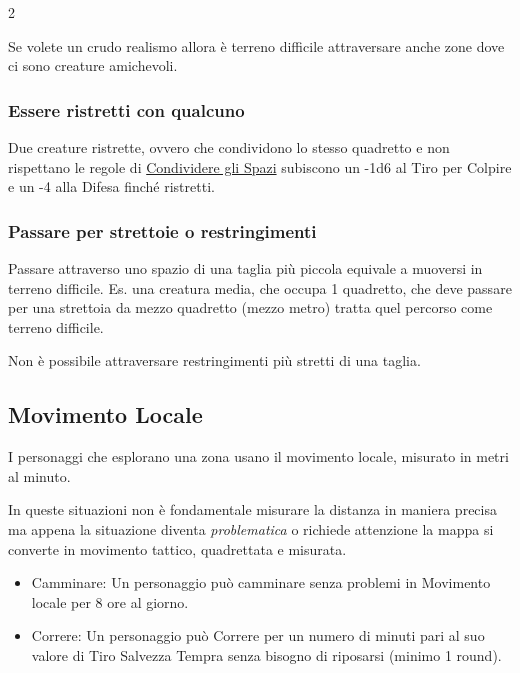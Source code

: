\begin{multicols}{2}
\begin{narratore}
Se volete un crudo realismo allora è terreno difficile attraversare anche zone dove ci sono creature amichevoli. \end{narratore}

\subsubsection{Essere ristretti con qualcuno}
Due creature ristrette, ovvero che condividono lo stesso quadretto e non rispettano le regole di \hyperlink{condividereglispazi}{Condividere gli Spazi} subiscono un -1d6 al Tiro per Colpire e un -4 alla Difesa finché ristretti.\hypertarget{ristretti}{}\label{ristretti}

\subsubsection{Passare per strettoie o restringimenti}

Passare attraverso uno spazio di una taglia più piccola equivale a muoversi in terreno difficile. Es. una creatura media, che occupa 1 quadretto, che deve passare per una strettoia da mezzo quadretto (mezzo metro) tratta quel percorso come terreno difficile.

Non è possibile attraversare restringimenti più stretti di una taglia.

\subsection{Movimento Locale}\label{movimentolocale}

I personaggi che esplorano una zona usano il movimento locale, misurato in metri al minuto.

In queste situazioni non è fondamentale misurare la distanza in maniera precisa ma appena la situazione diventa \emph{problematica} o richiede attenzione la mappa si converte in movimento tattico, quadrettata e misurata.

\begin{itemize}[leftmargin=*] \setlength{\itemsep}{0pt}
\item
Camminare: Un personaggio può camminare senza problemi in Movimento locale per 8 ore al giorno.
\item
Correre: Un personaggio può Correre per un numero di minuti pari al suo valore di Tiro Salvezza Tempra senza bisogno di riposarsi (minimo 1 round).
\end{itemize}


\end{multicols}
